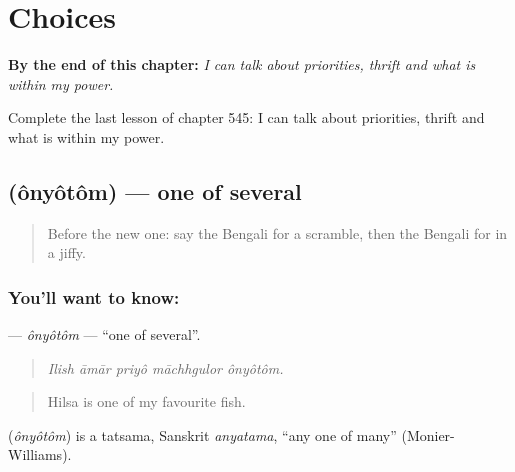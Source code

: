 
\chapter{Choices}
\label{ch:bn-choices}

\begin{chapteropening}
\textbf{By the end of this chapter:} \emph{I can talk about priorities, thrift and what is within my power.}

Complete the last lesson of chapter 545: I can talk about priorities, thrift and what is within my power.
\end{chapteropening}

\section[\texorpdfstring{\bn{অন্যতম} (ônyôtôm)}{অন্যতম (ônyôtôm)}]{ (ônyôtôm) — one of several}

\label{lesson:BN-C545-onyotom}



\begin{quote}
Before the new one: say the Bengali for a scramble, then the Bengali for in a jiffy.
\end{quote}

\subsection*{You'll want to know: }
\textbf{} — \emph{ônyôtôm} — \textquotedblleft{}one of several\textquotedblright{}.

\begin{quote}
    
\end{quote}

\begin{quote}
\emph{Ilish āmār priyô māchhgulor ônyôtôm.}
\end{quote}

\begin{quote}
Hilsa is one of my favourite fish.
\end{quote}

\begin{cousinweb}
\textbf{} (\emph{ônyôtôm}) is a tatsama, Sanskrit \emph{anyatama}, \textquotedblleft{}any one of many\textquotedblright{} (Monier-Williams).
\end{cousinweb}

